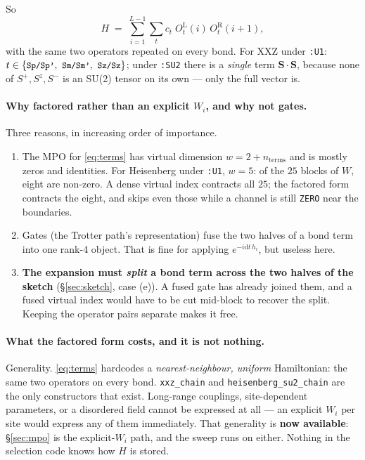 \documentclass[11pt,a4paper]{article}
\newcommand{\code}[1]{\texttt{\small #1}}
\newcommand{\dd}{\mathrm{d}}
\begin{document}
\noindent
So
\begin{equation}
  H \;=\; \sum_{i=1}^{L-1}\sum_t c_t\; O_t^{\mathrm{L}}(i)\, O_t^{\mathrm{R}}(i+1),
  \label{eq:terms}
\end{equation}
with the same two operators repeated on every bond. For XXZ under \code{:U1}:
$t\in\{\code{Sp/Sp'},\ \code{Sm/Sm'},\ \code{Sz/Sz}\}$; under \code{:SU2} there is a
\emph{single} term $\mathbf{S}\cdot\mathbf{S}$, because none of $S^+,S^z,S^-$ is an SU(2)
tensor on its own --- only the full vector is.

\paragraph{Why factored rather than an explicit $W_i$, and why not gates.} Three reasons, in
increasing order of importance.
\begin{enumerate}[nosep,leftmargin=1.6em]
  \item The MPO for \eqref{eq:terms} has virtual dimension $w = 2+n_{\text{terms}}$ and is
        mostly zeros and identities. For Heisenberg under \code{:U1}, $w=5$: of the $25$ blocks
        of $W$, eight are non-zero. A dense virtual index contracts all $25$; the factored form
        contracts the eight, and skips even those while a channel is still \code{ZERO} near the
        boundaries.
  \item Gates (the Trotter path's representation) fuse the two halves of a bond term into one
        rank-4 object. That is fine for applying $e^{-i\dd t\,h_i}$, but useless here.
  \item \textbf{The expansion must \emph{split} a bond term across the two halves of the
        sketch} (\S\ref{sec:sketch}, case (e)). A fused gate has already joined them, and a
        fused virtual index would have to be cut mid-block to recover the split. Keeping the
        operator pairs separate makes it free.
\end{enumerate}

\paragraph{What the factored form costs, and it is not nothing.} Generality. \eqref{eq:terms}
hardcodes a \emph{nearest-neighbour, uniform} Hamiltonian: the same two operators on every bond.
\code{xxz\_chain} and \code{heisenberg\_su2\_chain} are the only constructors that exist.
Long-range couplings, site-dependent parameters, or a disordered field cannot be expressed at
all --- an explicit $W_i$ per site would express any of them immediately. That generality is
\textbf{now available}: \S\ref{sec:mpo} is the explicit-$W_i$ path, and the sweep runs on either.
Nothing in the selection code knows how $H$ is stored.
\end{document}
